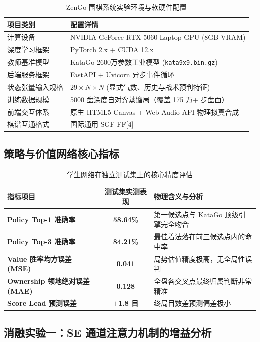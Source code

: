 \documentclass[11pt,a4paper]{ctexart}
\begin{document}
\begin{table}[H]
\centering
\caption{ZenGo 围棋系统实验环境与软硬件配置}
\label{tab:go_env}
\begin{tabular}{ll}
\toprule
\textbf{项目类别} & \textbf{配置详情} \\
\midrule
计算设备 & NVIDIA GeForce RTX 5060 Laptop GPU (8GB VRAM) \\
深度学习框架 & PyTorch 2.x + CUDA 12.x \\
教师基准模型 & KataGo 2600万参数工业模型 (\texttt{kata9x9.bin.gz}) \\
后端服务框架 & FastAPI + Uvicorn 异步事件循环 \\
状态张量输入规格 & $29 \times N \times N$ (显式气数、历史与战术预判特征) \\
训练数据规模 & 5000 盘深度自对弈蒸馏局（覆盖 175 万+ 步盘面） \\
前端交互体系 & 原生 HTML5 Canvas + Web Audio API 物理拟真合成 \\
棋谱互通格式 & 国际通用 SGF FF[4] \\
\bottomrule
\end{tabular}
\end{table}

\subsection{策略与价值网络核心指标}

\begin{table}[H]
\centering
\caption{学生网络在独立测试集上的核心精度评估}
\label{tab:metrics}
\begin{tabular}{lcl}
\toprule
\textbf{指标项目} & \textbf{测试集实测表现} & \textbf{物理含义与分析} \\
\midrule
\textbf{Policy Top-1 准确率} & \textbf{58.64\%} & 第一候选点与 KataGo 顶级引擎完全吻合 \\
\textbf{Policy Top-3 准确率} & \textbf{84.21\%} & 最佳着法落在前三候选点内的命中率 \\
\textbf{Value 胜率均方误差 (MSE)} & \textbf{0.041} & 局势估值精度极高，无全局性误判 \\
\textbf{Ownership 领地绝对误差 (MAE)} & \textbf{0.128} & 全盘各交叉点最终归属判断非常精准 \\
\textbf{Score Lead 预测误差} & \textbf{$\pm$1.8 目} & 终局目数差预测偏差极小 \\
\bottomrule
\end{tabular}
\end{table}

\subsection{消融实验一：SE 通道注意力机制的增益分析}
\end{document}
